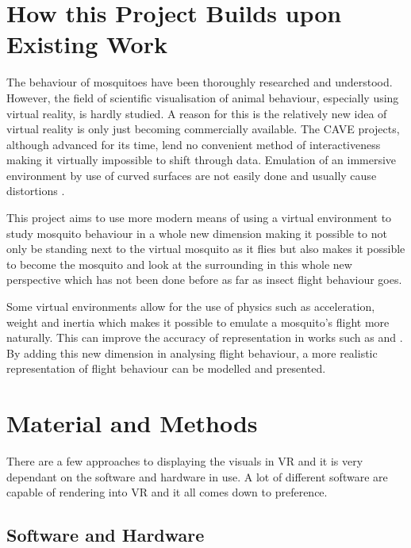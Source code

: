\section{How this Project Builds upon Existing Work}

The behaviour of mosquitoes have been thoroughly researched and understood. However, the field of scientific visualisation of animal behaviour, especially using virtual reality, is hardly studied. A reason for this is the relatively new idea of virtual reality is only just becoming commercially available. The CAVE projects, although advanced for its time, lend no convenient method of interactiveness making it virtually impossible to shift through data. Emulation of an immersive environment by use of curved surfaces are not easily done and usually cause distortions \cite{takalo2012fast}. 

This project aims to use more modern means of using a virtual environment to study mosquito behaviour in a whole new dimension making it possible to not only be standing next to the virtual mosquito as it flies but also makes it possible to become the mosquito and look at the surrounding in this whole new perspective which has not been done before as far as insect flight behaviour goes. 

Some virtual environments allow for the use of physics such as acceleration, weight and inertia which makes it possible to emulate a mosquito's flight more naturally. This can improve the accuracy of representation in works such as \cite{Dekker2963} and \cite{beeuwkes20083}. By adding this new dimension in analysing flight behaviour, a more realistic representation of flight behaviour can be modelled and presented.

\section{Material and Methods}

There are a few approaches to displaying the visuals in VR and it is very dependant on the software and hardware in use. A lot of different software are capable of rendering into VR and it all comes down to preference. 

\subsection{Software and Hardware}

